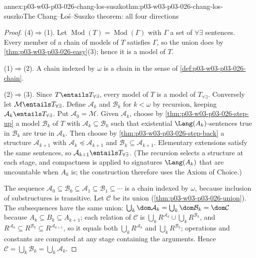 \begin{annexitem}{annex:p03-w03-p03-026-chang-los-suszko}{thm:p03-w03-p03-026-chang-los-suszko}{The Chang--\L o\'s--Suszko theorem: all four directions}
\begin{proof}
(4)\(\Rightarrow\)(1).  Let \(\operatorname{Mod}(T)=\operatorname{Mod}(\Gamma)\)
with \(\Gamma\) a set of \(\forall\exists\) sentences.  Every member of a
chain of models of \(T\) satisfies \(\Gamma\), so the union does by
\cref{thm:p03-w03-p03-026-easy}(3); hence it is a model of \(T\).

(1)\(\Rightarrow\)(2).  A chain indexed by \(\omega\) is a chain in the sense
of \cref{def:p03-w03-p03-026-chain}.

(2)\(\Rightarrow\)(3).  Since \(T\entails T_{\forall\exists}\), every model
of \(T\) is a model of \(T_{\forall\exists}\).  Conversely let
\(\mathcal M\entails T_{\forall\exists}\).  Define \(\mathcal A_k\) and
\(\mathcal B_k\) for \(k<\omega\) by recursion, keeping
\(\mathcal A_k\entails T_{\forall\exists}\).  Put
\(\mathcal A_0=\mathcal M\).  Given \(\mathcal A_k\), choose by
\cref{thm:p03-w03-p03-026-step-up} a model \(\mathcal B_k\) of \(T\) with
\(\mathcal A_k\subseteq\mathcal B_k\) such that existential
\(\Lang(A_k)\)-sentences true in \(\mathcal B_k\) are true in
\(\mathcal A_k\).  Then choose by \cref{thm:p03-w03-p03-026-step-back} a
structure \(\mathcal A_{k+1}\) with
\(\mathcal A_k\preccurlyeq\mathcal A_{k+1}\) and
\(\mathcal B_k\subseteq\mathcal A_{k+1}\).  Elementary extensions satisfy
the same sentences, so \(\mathcal A_{k+1}\entails T_{\forall\exists}\).
(The recursion selects a structure at each stage, and compactness is applied
to signatures \(\Lang(A_k)\) that are uncountable when \(A_k\) is; the
construction therefore uses the Axiom of Choice.)

The sequence
\(\mathcal A_0\subseteq\mathcal B_0\subseteq\mathcal A_1\subseteq\mathcal B_1\subseteq\cdots\)
is a chain indexed by \(\omega\), because inclusion of substructures is
transitive.  Let \(\mathcal C\) be its union
(\cref{thm:p03-w03-p03-026-union}).  The subsequences have the same union:
\(\bigcup_k\dom\mathcal A_k=\bigcup_k\dom\mathcal B_k=\dom\mathcal C\)
because \(A_k\subseteq B_k\subseteq A_{k+1}\); each relation of
\(\mathcal C\) is
\(\bigcup_kR^{\mathcal A_k}\cup\bigcup_kR^{\mathcal B_k}\), and
\(R^{\mathcal A_k}\subseteq R^{\mathcal B_k}\subseteq R^{\mathcal A_{k+1}}\),
so it equals both \(\bigcup_kR^{\mathcal A_k}\) and \(\bigcup_kR^{\mathcal B_k}\);
operations and constants are computed at any stage containing the arguments.
Hence \(\mathcal C=\bigcup_k\mathcal B_k=\bigcup_k\mathcal A_k\).


\end{proof}
\end{annexitem}
